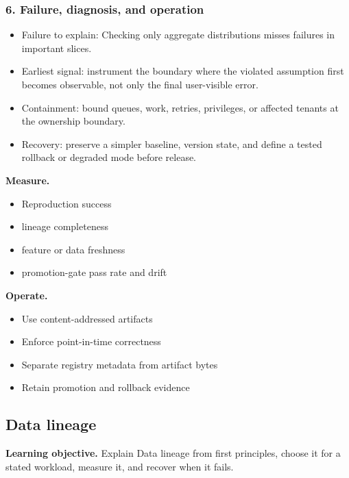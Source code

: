 \subsubsection*{6. Failure, diagnosis, and operation}
\begin{itemize}
\item Failure to explain: Checking only aggregate distributions misses failures in important slices.
\item Earliest signal: instrument the boundary where the violated assumption first becomes observable, not only the final user-visible error.
\item Containment: bound queues, work, retries, privileges, or affected tenants at the ownership boundary.
\item Recovery: preserve a simpler baseline, version state, and define a tested rollback or degraded mode before release.
\end{itemize}
\textbf{Measure.}\begin{itemize}
\item Reproduction success
\item lineage completeness
\item feature or data freshness
\item promotion-gate pass rate and drift
\end{itemize}
\textbf{Operate.}\begin{itemize}
\item Use content-addressed artifacts
\item Enforce point-in-time correctness
\item Separate registry metadata from artifact bytes
\item Retain promotion and rollback evidence
\end{itemize}
\subsection{Data lineage}
\textbf{Learning objective.} Explain Data lineage from first principles, choose it for a stated workload, measure it, and recover when it fails.
